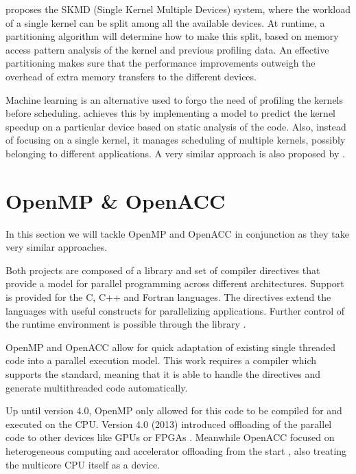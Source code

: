 \cite{transparent_cpu_gpu_collaboration} proposes the SKMD (Single Kernel Multiple Devices) system, where the workload of a single kernel can be split among all the available devices. At runtime, a partitioning algorithm will determine how to make this split, based on memory access pattern analysis of the kernel and previous profiling data. An effective partitioning makes sure that the performance improvements outweigh the overhead of extra memory transfers to the different devices. 

Machine learning is an alternative used to forgo the need of profiling the kernels before scheduling. \cite{smart_multitasking_scheduling} achieves this by implementing a model to predict the kernel speedup on a particular device based on static analysis of the code. Also, instead of focusing on a single kernel, it manages scheduling of multiple kernels, possibly belonging to different applications. A very similar approach is also proposed by \cite{load_balance_model_opencl_integrated_cluster}.

\section{OpenMP \& OpenACC}
In this section we will tackle OpenMP and OpenACC in conjunction as they take very similar approaches.

Both projects are composed of a library and set of compiler directives that provide a model for parallel programming across different architectures. Support is provided for the C, C++ and Fortran languages. The directives extend the languages with useful constructs for parallelizing applications. Further control of the runtime environment is possible through the library \cite{openmp_spec} \cite{openacc_spec}.

OpenMP and OpenACC allow for quick adaptation of existing single threaded code into a parallel execution model. This work requires a compiler which supports the standard, meaning that it is able to handle the directives and generate multithreaded code automatically. 

Up until version 4.0, OpenMP only allowed for this code to be compiled for and executed on the CPU. Version 4.0 (2013) introduced offloading of the parallel code to other devices like GPUs or FPGAs \cite{openmp_gpu_support}. Meanwhile OpenACC focused on heterogeneous computing and accelerator offloading from the start \cite{openacc_initial_spec}, also treating the multicore CPU itself as a device.

